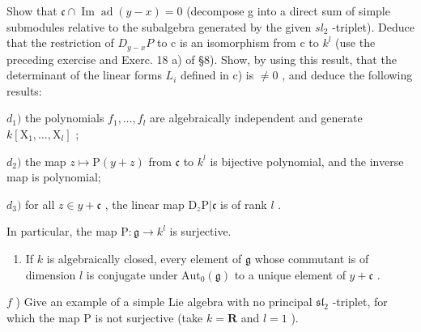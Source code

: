 Show that \(\mathfrak{c}\cap\operatorname{Im}\operatorname{ad}(y-x)=0\) (decompose g into a direct sum of simple submodules relative to the subalgebra generated by the given \(sl_{2}\) -triplet). Deduce that the restriction of \(D_{y-x}P\) to c is an isomorphism from c to \(k^{l}\) (use the preceding exercise and Exerc. 18 a) of §8). Show, by using this result, that the determinant of the linear forms \(L_{i}\) defined in c) is \(\neq0\) , and deduce the following results:

\(d_{1})\) the polynomials \(f_{1},\ldots ,f_{l}\) are algebraically independent and generate \(k[\mathrm{X}_1,\dots ,\mathrm{X}_l]\) ;

\(d_{2})\) the map \(z \mapsto \mathrm{P}(y + z)\) from \(\mathfrak{c}\) to \(k^{l}\) is bijective polynomial, and the inverse map is polynomial;

\(d_{3})\) for all \(z\in y + \mathfrak{c}\) , the linear map \(\mathrm{D}_z\mathrm{P}|\mathfrak{c}\) is of rank \(l\) .

In particular, the map \(\mathrm{P}:\mathfrak{g}\to k^l\) is surjective.

\begin{enumerate}
\def\labelenumi{\alph{enumi})}
\setcounter{enumi}{4}
\tightlist
\item
  If \(k\) is algebraically closed, every element of \(\mathfrak{g}\) whose commutant is of dimension \(l\) is conjugate under \(\mathrm{Aut}_0(\mathfrak{g})\) to a unique element of \(y + \mathfrak{c}\) .
\end{enumerate}

\(f\) ) Give an example of a simple Lie algebra with no principal \(\mathfrak{sl}_2\) -triplet, for which the map \(\mathrm{P}\) is not surjective (take \(k = \mathbf{R}\) and \(l = 1\) ).

